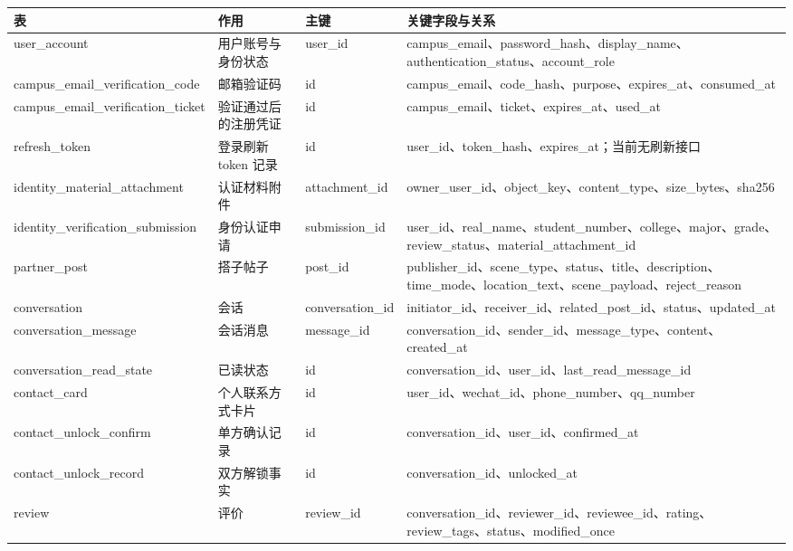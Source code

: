 \documentclass[
]{ctexart}
\begin{document}
\begin{longtable}[]{@{}
  >{\raggedright\arraybackslash}p{}
  >{\raggedright\arraybackslash}p{}
  >{\raggedright\arraybackslash}p{}
  >{\raggedright\arraybackslash}p{}@{}}
\toprule
表 & 作用 & 主键 & 关键字段与关系 \\
\midrule
\endhead
user\_account & 用户账号与身份状态 & user\_id &
campus\_email、password\_hash、display\_name、authentication\_status、account\_role \\
campus\_email\_verification\_code & 邮箱验证码 & id &
campus\_email、code\_hash、purpose、expires\_at、consumed\_at \\
campus\_email\_verification\_ticket & 验证通过后的注册凭证 & id &
campus\_email、ticket、expires\_at、used\_at \\
refresh\_token & 登录刷新 token 记录 & id &
user\_id、token\_hash、expires\_at；当前无刷新接口 \\
identity\_material\_attachment & 认证材料附件 & attachment\_id &
owner\_user\_id、object\_key、content\_type、size\_bytes、sha256 \\
identity\_verification\_submission & 身份认证申请 & submission\_id &
user\_id、real\_name、student\_number、college、major、grade、review\_status、material\_attachment\_id \\
partner\_post & 搭子帖子 & post\_id &
publisher\_id、scene\_type、status、title、description、time\_mode、location\_text、scene\_payload、reject\_reason \\
conversation & 会话 & conversation\_id &
initiator\_id、receiver\_id、related\_post\_id、status、updated\_at \\
conversation\_message & 会话消息 & message\_id &
conversation\_id、sender\_id、message\_type、content、created\_at \\
conversation\_read\_state & 已读状态 & id &
conversation\_id、user\_id、last\_read\_message\_id \\
contact\_card & 个人联系方式卡片 & id &
user\_id、wechat\_id、phone\_number、qq\_number \\
contact\_unlock\_confirm & 单方确认记录 & id &
conversation\_id、user\_id、confirmed\_at \\
contact\_unlock\_record & 双方解锁事实 & id &
conversation\_id、unlocked\_at \\
review & 评价 & review\_id &
conversation\_id、reviewer\_id、reviewee\_id、rating、review\_tags、status、modified\_once \\
\bottomrule
\end{longtable}
\end{document}
